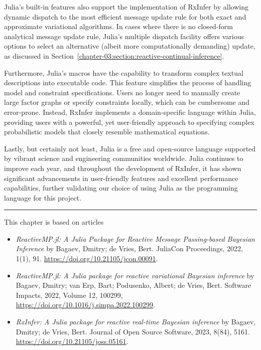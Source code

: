 Julia's built-in features also support the implementation of RxInfer by allowing dynamic
dispatch to the most efficient message update rule for both exact and approximate variational
algorithms.
In cases where there is no closed-form analytical message update rule, Julia's multiple dispatch facility offers various options to select an alternative (albeit more computationally
demanding) update, as discussed in
Section~\ref{chapter-03:section:reactive-continual-inference}.

Furthermore, Julia's macros have the capability to transform complex textual descriptions into
executable code.
This feature simplifies the process of handling model and constraint specifications.
Users no longer need to manually create large factor graphs or specify constraints locally,
which can be cumbersome and error-prone.
Instead, RxInfer implements a domain-specific language within Julia, providing users with a
powerful, yet user-friendly approach to specifying complex probabilistic models that closely
resemble mathematical equations.

Lastly, but certainly not least, Julia is a free and open-source language supported by vibrant
science and engineering communities worldwide.
Julia continues to improve each year, and throughout the development of RxInfer, it has shown
significant advancements in user-friendly features and excellent performance capabilities,
further validating our choice of using Julia as the programming language for this project.

\par\noindent\rule{\textwidth}{0.5pt}

This chapter is based on articles
\begin{itemize}
    \item \textit{ReactiveMP.jl: A Julia Package for Reactive Message Passing-based Bayesian Inference} by Bagaev, Dmitry; de Vries, Bert. JuliaCon Proceedings, 2022, 1(1), 91. \url{https://doi.org/10.21105/jcon.00091}.
    \item \textit{ReactiveMP.jl: A Julia package for reactive variational Bayesian inference} by Bagaev, Dmitry; van Erp, Bart; Podusenko, Albert; de Vries, Bert. Software Impacts, 2022, Volume 12, 100299, \url{https://doi.org/10.1016/j.simpa.2022.100299}.
    \item \textit{RxInfer: A Julia package for reactive real-time Bayesian inference} by Bagaev, Dmitry; de Vries, Bert. Journal of Open Source Software, 2023, 8(84), 5161. \url{https://doi.org/10.21105/joss.05161}.
\end{itemize}
